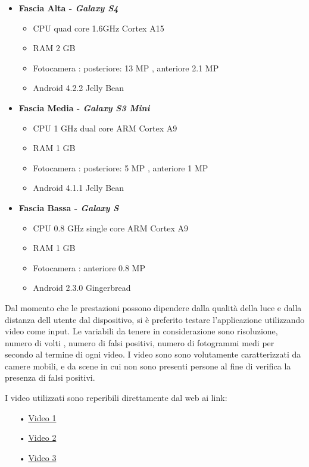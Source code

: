 \begin{itemize}
\item \textbf{Fascia Alta - \textit{Galaxy S4}} 
	\begin{itemize}
		\item CPU quad core 1.6GHz Cortex A15 
		\item RAM 2 GB 
		\item Fotocamera : posteriore: 13 MP , anteriore 2.1 MP
		\item Android 4.2.2 Jelly Bean 
	\end{itemize}
\item \textbf{Fascia Media - \textit{Galaxy S3 Mini}}
	\begin{itemize}
		\item CPU 1 GHz dual core ARM Cortex A9
		\item RAM 1 GB 
		\item Fotocamera : posteriore: 5 MP , anteriore 1 MP
		\item Android 4.1.1 Jelly Bean 
	\end{itemize}
\item \textbf{Fascia Bassa - \textit{Galaxy S}}
	\begin{itemize}
		\item CPU 0.8 GHz single core ARM Cortex A9
		\item RAM 1 GB 
		\item Fotocamera : anteriore 0.8 MP
		\item Android 2.3.0 Gingerbread
	\end{itemize}
\end{itemize}

Dal momento che le prestazioni possono dipendere dalla qualità della luce e dalla distanza dell utente dal dispositivo, si è preferito testare l'applicazione utilizzando video come input. Le variabili da tenere in considerazione sono risoluzione, numero di volti , numero di falsi positivi, numero di fotogrammi medi per secondo al termine di ogni video. I video sono sono volutamente caratterizzati da camere mobili, e da scene in cui non sono presenti persone al fine di verifica la presenza di falsi positivi.

I video utilizzati sono reperibili direttamente dal web ai link:

\begin{itemize}
\item[•] \href{http://www.youtube.com/watch?v=IIdGxR-aU6o}{Video 1}
\item[•] \href{http://www.youtube.com/watch?v=yWPyRSURYFQ}{Video 2}
\item[•] \href{http://www.youtube.com/watch?v=sL7cqpIvvRk}{Video 3}
\end{itemize}


